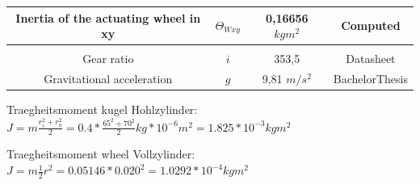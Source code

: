 \documentclass[twoside,colorback,accentcolor=tud4c,11pt]{tudreport}
\begin{document}
\begin{table}[]
\begin{tabular}{cccc}
\multicolumn{1}{|c|}{Inertia of the actuating wheel in xy}                                                              & \multicolumn{1}{c|}{$\Theta_{Wxy}$}         & \multicolumn{1}{c|}{0,16656 $kgm^{2}$}     & \multicolumn{1}{c|}{Computed}              \\ \hline
                                                                                                                        &                                              &                                                            &                                            \\ \hline
\multicolumn{1}{|c|}{Gear ratio}                                                                                        & \multicolumn{1}{c|}{$i$}                       & \multicolumn{1}{c|}{353,5}                                 & \multicolumn{1}{c|}{Datasheet}             \\ \hline
\multicolumn{1}{|c|}{Gravitational acceleration}                                                                        & \multicolumn{1}{c|}{$g$}                       & \multicolumn{1}{c|}{9,81 $m/s^{2}$}        & \multicolumn{1}{c|}{BachelorThesis}        \\ \hline
\end{tabular}
\end{table}

Traegheitsmoment kugel Hohlzylinder: $J=m \frac{r_i^2+r_a^2}{2} = 0.4 * \frac{65^2+70^2}{2} kg *10^ {-6} m^2=1.825 *10^{-3} kg m^2$ 

Traegheitsmoment wheel Vollzylinder: $J=m \frac{1}{2} r^2 = 0.05146 * 0.020^2 = 1.0292 * 10^{-4} kg m^2$ 
	
	
\end{document}
